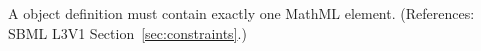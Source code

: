 A \Constraint object definition must contain exactly one MathML
 element.  (References: SBML L3V1
Section~\ref{sec:constraints}.)
